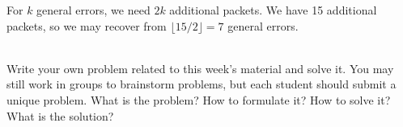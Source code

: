 \documentclass[]{article}
\begin{document}
\begin{qunlist}
{{For $ k $ general errors, we need $ 2k $ additional packets. We have 15 additional packets, so we may recover from $ \lfloor 15/2 \rfloor = 7 $ general errors.
}}\fi



 \\
Write your own problem related to this week's material and solve it. You may still work in groups to brainstorm problems, but each student should submit a unique problem. What is the problem? How to formulate it? How to solve it? What is the solution?
  
  
    
\end{qunlist}
\end{document}
